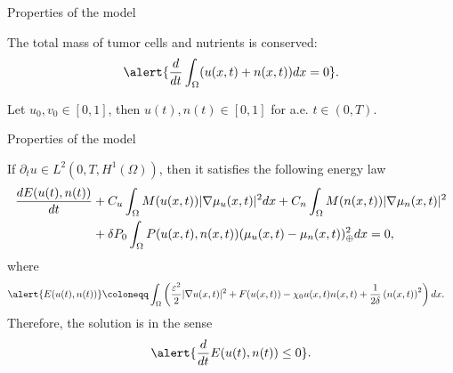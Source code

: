 \begin{frame}{Properties of the model}
	\begin{proposition}
		The total mass of tumor cells and nutrients is conserved: $$\alert{\frac{d}{dt}\int_\Omega (u(x,t)+n(x,t))dx=0}.$$
	\end{proposition}
	\begin{proposition}
		Let $u_0,v_0\in[0,1]$, then \alert{$u(t),n(t)\in[0,1]$} for a.e. $t\in(0,T)$.
	\end{proposition}
	\vspace*{0.6cm}
\end{frame}
\begin{frame}{Properties of the model}
	\scriptsize
	\begin{proposition}
		If $\partial_t u\in L^2(0,T, H^1(\Omega))$, then it satisfies the following energy law
		\begin{align*}
			\frac{d E(u(t),n(t))}{dt}&+C_u\int_\Omega M(u(x,t))|\nabla\mu_u(x,t)|^2dx+C_n\int_\Omega M(n(x,t))|\nabla\mu_n(x,t)|^2\notag\\&+\delta P_0\int_\Omega P(u(x,t),n(x,t))(\mu_u(x,t)-\mu_n(x,t))_\oplus ^2dx=0,
		\end{align*}
		where
		\begin{align*}
			\alert{E(u(t),n(t))}&\coloneqq\int_\Omega\left(\frac{\varepsilon^2}{2}|\nabla u(x,t)|^2+ F(u(x,t))-\chi_0u(x,t)n(x,t)+\frac{1}{2\delta}\left(n(x,t)\right)^2\right)dx.
		\end{align*}
		Therefore, the solution is  in the sense $$\alert{\frac{d}{dt}E(u(t),n(t))\le 0}.$$
	\end{proposition}
\end{frame}

